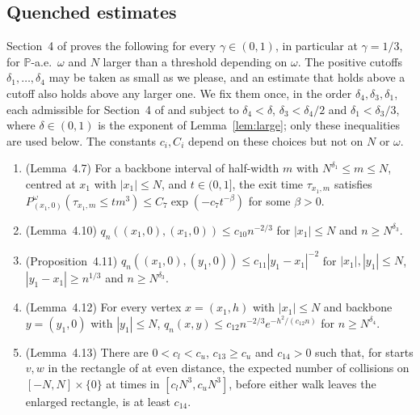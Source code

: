 \documentclass[11pt]{amsart}
\theoremstyle{remark}
\numberwithin{equation}{section}
\newcommand{\PP}{\mathbb{P}}
\begin{document}
\subsection{Quenched estimates}
Section~4 of \cite{DNNS} proves the following for every $\gamma\in(0,1)$, in particular at $\gamma=1/3$, for $\PP$-a.e.\ $\omega$ and $N$ larger than a threshold depending on $\omega$. The positive cutoffs $\delta_1,\dots,\delta_4$ may be taken as small as we please, and an estimate that holds above a cutoff also holds above any larger one. We fix them once, in the order $\delta_4,\delta_3,\delta_1$, each admissible for Section~4 of \cite{DNNS} and subject to $\delta_4<\delta$, $\delta_3<\delta_4/2$ and $\delta_1<\delta_3/3$, where $\delta\in(0,1)$ is the exponent of Lemma~\ref{lem:large}; only these inequalities are used below. The constants $c_i,C_i$ depend on these choices but not on $N$ or $\omega$.
\begin{enumerate}[label=(E\arabic*),leftmargin=*]
\item\label{E:exit} (Lemma~4.7) For a backbone interval of half-width $m$ with $N^{\delta_1}\le m\le N$, centred at $x_1$ with $|x_1|\le N$, and $t\in(0,1]$, the exit time $\tau_{x_1,m}$ satisfies $P^\omega_{(x_1,0)}(\tau_{x_1,m}\le tm^3)\le C_7\exp(-c_7t^{-\beta})$ for some $\beta>0$.
\item\label{E:diag} (Lemma~4.10) $q_n((x_1,0),(x_1,0))\le c_{10}n^{-2/3}$ for $|x_1|\le N$ and $n\ge N^{\delta_3}$.
\item\label{E:off} (Proposition~4.11) $q_n((x_1,0),(y_1,0))\le c_{11}|y_1-x_1|^{-2}$ for $|x_1|,|y_1|\le N$, $|y_1-x_1|\ge n^{1/3}$ and $n\ge N^{\delta_3}$.
\item\label{E:gen} (Lemma~4.12) For every vertex $x=(x_1,h)$ with $|x_1|\le N$ and backbone $y=(y_1,0)$ with $|y_1|\le N$, $q_n(x,y)\le c_{12}n^{-2/3}e^{-h^2/(c_{12}n)}$ for $n\ge N^{\delta_4}$.
\item\label{E:first} (Lemma~4.13) There are $0<c_l<c_u$, $c_{13}\ge c_u$ and $c_{14}>0$ such that, for starts $v,w$ in the rectangle of \cite{DNNS} at even distance, the expected number of collisions on $[-N,N]\times\{0\}$ at times in $[c_lN^3,c_uN^3]$, before either walk leaves the enlarged rectangle, is at least $c_{14}$.
\end{enumerate}
\end{document}

